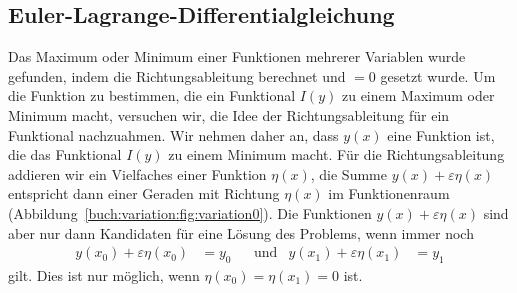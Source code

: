 %
%
%

%
%
\subsection{Euler-Lagrange-Differentialgleichung
\label{buch:variation:eulerlagrange:subsection:dgl}}

Das Maximum oder Minimum einer Funktionen mehrerer Variablen wurde
gefunden, indem die Richtungsableitung berechnet und $=0$ gesetzt
wurde.
Um die Funktion zu bestimmen, die ein Funktional $I(y)$ zu einem
Maximum oder Minimum macht, versuchen wir, die Idee der Richtungsableitung
für ein Funktional nachzuahmen.
Wir nehmen daher an, dass $y(x)$ eine Funktion ist, die das Funktional
$I(y)$ zu einem Minimum macht.
Für die Richtungsableitung addieren wir ein Vielfaches einer
Funktion $\eta(x)$, die Summe $y(x)+\varepsilon\eta(x)$ entspricht
dann einer Geraden mit Richtung $\eta(x)$ im Funktionenraum
(Abbildung~\ref{buch:variation:fig:variation0}).
Die Funktionen $y(x)+\varepsilon\eta(x)$ sind aber nur dann Kandidaten
für eine Lösung des Problems, wenn immer noch
\begin{align*}
y(x_0) + \varepsilon \eta(x_0) &= y_0
&&\text{und}&
y(x_1) + \varepsilon \eta(x_1) &= y_1
\end{align*}
gilt.
Dies ist nur möglich, wenn $\eta(x_0)=\eta(x_1)=0$ ist.

%
%
